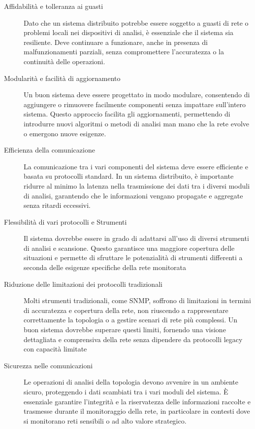 \documentclass[target=bach,aauheader=,style=]{thud}
\begin{document}
\begin{description}
  \item[Affidabilità e tolleranza ai guasti]
  Dato che un sistema distribuito potrebbe essere soggetto a guasti di rete o problemi locali nei dispositivi di analisi, è essenziale che il sistema sia resiliente. Deve continuare a funzionare, anche in presenza di malfunzionamenti parziali, senza compromettere l'accuratezza o la continuità delle operazioni.

  \item[Modularità e facilità di aggiornamento]
  Un buon sistema deve essere progettato in modo modulare, consentendo di aggiungere o rimuovere facilmente componenti senza impattare sull'intero sistema. Questo approccio facilita gli aggiornamenti, permettendo di introdurre nuovi algoritmi o metodi di analisi man mano che la rete evolve o emergono nuove esigenze.

  \item[Efficienza della comunicazione]
  La comunicazione tra i vari componenti del sistema deve essere efficiente e basata su protocolli standard. In un sistema distribuito, è importante ridurre al minimo la latenza nella trasmissione dei dati tra i diversi moduli di analisi, garantendo che le informazioni vengano propagate e aggregate senza ritardi eccessivi.

\item[Flessibilità di vari protocolli e Strumenti]
    Il sistema dovrebbe essere in grado di adattarsi all'uso di diversi strumenti di analisi e scansione. Questo garantisce una maggiore copertura delle situazioni e permette di sfruttare le potenzialità di strumenti differenti a seconda delle esigenze specifiche della rete monitorata

  \item[Riduzione delle limitazioni dei protocolli tradizionali]
  Molti strumenti tradizionali, come SNMP, soffrono di limitazioni in termini di accuratezza e copertura della rete, non riuscendo a rappresentare correttamente la topologia o a gestire scenari di rete più complessi. Un buon sistema dovrebbe superare questi limiti, fornendo una visione dettagliata e comprensiva della rete senza dipendere da protocolli legacy con capacità limitate

  \item[Sicurezza nelle comunicazioni]
  Le operazioni di analisi della topologia devono avvenire in un ambiente sicuro, proteggendo i dati scambiati tra i vari moduli del sistema. È essenziale garantire l'integrità e la riservatezza delle informazioni raccolte e trasmesse durante il monitoraggio della rete, in particolare in contesti dove si monitorano reti sensibili o ad alto valore strategico.

\end{description}
\end{document}
